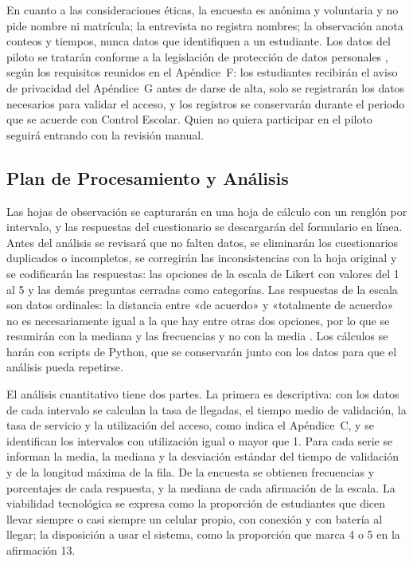 En cuanto a las consideraciones éticas, la encuesta es anónima y voluntaria y
no pide nombre ni matrícula; la entrevista no registra nombres; la
observación anota conteos y tiempos, nunca datos que identifiquen a un
estudiante. Los datos del piloto se tratarán conforme a la legislación de
protección de datos personales \parencite{edomex2017datos, lgpdppso2025},
según los requisitos reunidos en el Apéndice~F: los estudiantes recibirán el
aviso de privacidad del Apéndice~G antes de darse de alta, solo se
registrarán los datos necesarios para validar el acceso, y los registros se
conservarán durante el periodo que se acuerde con Control Escolar. Quien no
quiera participar en el piloto seguirá entrando con la revisión manual.

\subsection{Plan de Procesamiento y Análisis}
Las hojas de observación se capturarán en una hoja de cálculo con un renglón
por intervalo, y las respuestas del cuestionario se descargarán del
formulario en línea. Antes del análisis se revisará que no falten datos, se
eliminarán los cuestionarios duplicados o incompletos, se corregirán las
inconsistencias con la hoja original y se codificarán las respuestas: las
opciones de la escala de Likert con valores del 1 al 5 y las demás preguntas
cerradas como categorías. Las respuestas de la escala son datos ordinales: la
distancia entre «de acuerdo» y «totalmente de acuerdo» no es necesariamente
igual a la que hay entre otras dos opciones, por lo que se resumirán con la
mediana y las frecuencias y no con la media \parencite{jamieson2004likert}.
Los cálculos se harán con scripts de Python, que se
conservarán junto con los datos para que el análisis pueda repetirse.

El análisis cuantitativo tiene dos partes. La primera es descriptiva: con los
datos de cada intervalo se calculan la tasa de llegadas, el tiempo medio de
validación, la tasa de servicio y la utilización del acceso, como indica el
Apéndice~C, y se identifican los intervalos con utilización igual o mayor
que 1. Para cada serie se informan la media, la mediana y la desviación
estándar del tiempo de validación y de la longitud máxima de la fila. De la
encuesta se obtienen frecuencias y porcentajes de cada respuesta, y la
mediana de cada afirmación de la escala. La viabilidad tecnológica se
expresa como la proporción de estudiantes que dicen llevar siempre o casi
siempre un celular propio, con conexión y con batería al llegar; la
disposición a usar el sistema, como la proporción que marca 4 o 5 en la
afirmación 13.

